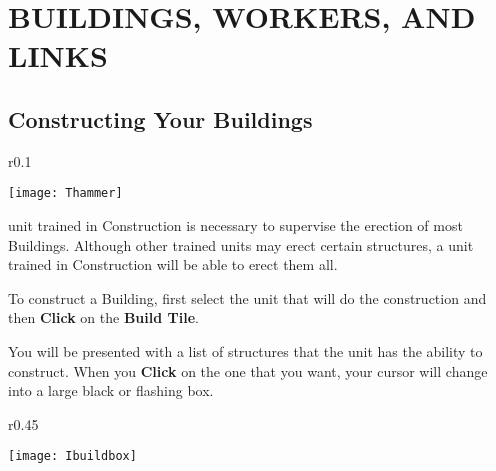 
\chapter[Buildings, Workers, and Links]{\textsf{BUILDINGS, WORKERS, AND LINKS}}

\section{\textsf{Constructing Your Buildings}}


\begin{wrapfigure}{r}{0.1\textwidth}
    \vspace{-20pt}
    \begin{center}
        \texttt{[image: Thammer]}
    \end{center}
    \vspace{-20pt}
\end{wrapfigure}

 unit trained in Construction is necessary to supervise the erection of most Buildings. Although other trained units may erect certain structures, a unit trained in Construction will be able to erect them all.

To construct a Building, first select the unit that will do the construction and then \textbf{Click} on the \textbf{Build Tile}.

You will be presented with a list of structures that the unit has the ability to construct. When you \textbf{Click} on the one that you want, your cursor will change into a large black or flashing box.

\begin{wrapfigure}{r}{0.45\textwidth}
    \vspace{-20pt}
    \begin{center}
        \texttt{[image: Ibuildbox]} %
    \end{center}
    \vspace{-20pt}
\end{wrapfigure}

